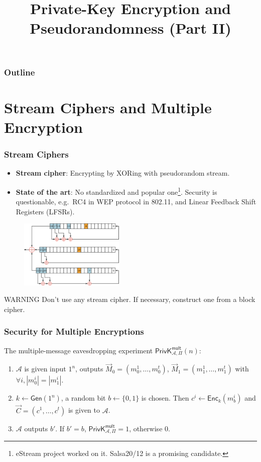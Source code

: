 

\title{Private-Key Encryption and Pseudorandomness (Part II)}


\maketitle
\begin{frame}
\frametitle{Outline}
\tableofcontents
\end{frame}
\section{Stream Ciphers and Multiple Encryption}
\begin{frame}\frametitle{Stream Ciphers}
\begin{itemize}
\item \textbf{Stream cipher}: Encrypting by XORing with pseudorandom stream.
\item \textbf{State of the art}: No standardized and popular one\footnote{eStream project worked on it. Salsa20/12 is a promising candidate.}. Security is questionable, e.g.\  RC4 in WEP protocol in 802.11, and Linear Feedback Shift Registers (LFSRs).
\end{itemize}
\begin{figure}
\begin{center}
\includegraphics[width=50mm]{pic/A5-1_GSM_cipher} 
\end{center}
\end{figure}
\begin{alertblock}{WARNING}
Don't use any stream cipher. If necessary, construct one from a block cipher.
\end{alertblock}
\end{frame}
\begin{frame}\frametitle{Security for Multiple Encryptions}
The multiple-message eavesdropping experiment $\mathsf{PrivK}^{\mathsf{mult}}_{\mathcal{A},\Pi}(n)$:
\begin{enumerate}
	\item $\mathcal{A}$ is given input $1^n$, outputs $\vec{M}_0=(m_0^1,\dots,m_0^t)$, $\vec{M}_1=(m_1^1,\dots,m_1^t)$ with $\forall i, |m_0^i| = |m_1^i|$.
	\item $k \gets \mathsf{Gen}(1^n)$, a random bit $b \gets \{0,1\}$ is chosen. Then $c^i \gets \mathsf{Enc}_k(m_b^i)$ and $\vec{C}=(c^1,\dots,c^t)$ is given to $\mathcal{A}$.
	\item $\mathcal{A}$ outputs $b'$. If $b' = b$, $\mathsf{PrivK}^{\mathsf{mult}}_{\mathcal{A},\Pi}=1$, otherwise 0.
\end{enumerate}
\begin{figure}
\begin{center}

\end{center}
\end{figure}
\end{frame}
